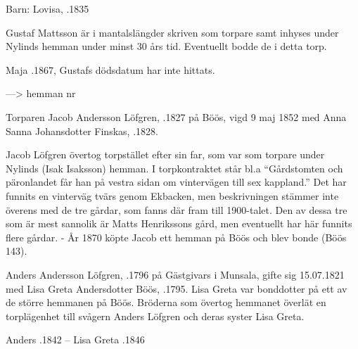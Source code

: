 Barn:	Lovisa, .1835

Gustaf Mattsson är i mantalslängder skriven som torpare samt inhyses under Nylinds hemman under minst 30 års tid. Eventuellt bodde de i detta torp.

Maja .1867, Gustafs dödsdatum har inte hittats.



--->  hemman				      nr 

Torparen Jacob Andersson Löfgren, .1827 på Böös, vigd 9 maj 1852 med Anna Sanna Johansdotter Finskas, .1828.
\begin{jhchildren}
  \item {}
  \item {}
  \item {}
  \item {}
  \item {}
  \item {}
  \item {}
\end{jhchildren}
Jacob Löfgren övertog torpstället efter sin far, som var som torpare under Nylinds (Isak Isaksson) hemman. I torpkontraktet står bl.a ``Gårdstomten och päronlandet får han på vestra sidan om vintervägen till sex kappland.'' Det har funnits en vinterväg tvärs genom Ekbacken, men beskrivningen stämmer inte överens med de tre gårdar, som fanns där fram till 1900-talet. Den av dessa tre som är mest sannolik är Matts Henrikssons gård, men eventuellt har här funnits flere gårdar. - År 1870 köpte Jacob ett hemman på Böös och blev bonde (Böös 143).


Anders Andersson Löfgren, .1796 på Gästgivars i Munsala, gifte sig 15.07.1821 med Lisa Greta Andersdotter Böös, .1795. Lisa Greta var bonddotter på ett av de större hemmanen på Böös. Bröderna som övertog hemmanet överlät en torplägenhet till svågern Anders Löfgren och deras syster Lisa Greta.
\begin{jhchildren}
  \item {}
  \item {}
  \item {}
  \item {}
  \item {}
  \item {}
\end{jhchildren}
Anders .1842  --  Lisa Greta .1846



